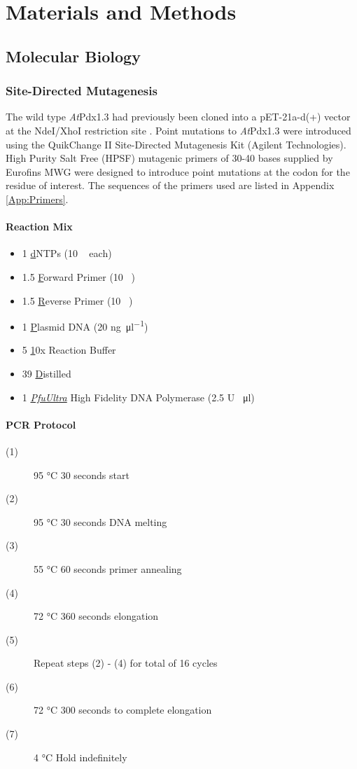  \chapter{Materials and Methods}\label{ch:Methods}
	\section{Molecular Biology}
		\subsection*{Site-Directed Mutagenesis}
		
The wild type \textit{At}Pdx1.3 had previously been cloned into a pET-21a-d(+) vector at the NdeI/XhoI restriction site \cite{Tambasco2005}. Point mutations to \textit{At}Pdx1.3 were introduced using the QuikChange II Site-Directed Mutagenesis Kit (Agilent Technologies). High Purity Salt Free (HPSF) mutagenic primers of 30-40 bases supplied by Eurofins MWG were designed to introduce point mutations at the codon for the residue of interest. The sequences of the primers used are listed in Appendix \ref{App:Primers}.
  
			\subsubsection{Reaction Mix}
				\begin{itemize}
				\item 1 \ul dNTPs (10 \si{\milli\molar} each)
				\item 1.5 \ul Forward Primer (10 \si{\micro\molar})
				\item 1.5 \ul Reverse Primer (10 \si{\micro\molar})
				\item 1 \ul Plasmid DNA (20 \si{\nano\gram\per\micro\litre})
				\item 5 \ul 10x Reaction Buffer
				\item 39 \ul Distilled  
				\item 1 \ul \textit{PfuUltra} High Fidelity DNA Polymerase (2.5 U \si{\per\micro\litre})	 
				\end{itemize}
\newpage				
			\subsubsection{PCR Protocol}
			\begin{description}
			\item[(1)] 95 \si{\degreeCelsius} 30 seconds start
			\item[(2)] 95 \si{\degreeCelsius} 30 seconds DNA melting	
			\item[(3)] 55 \si{\degreeCelsius} 60 seconds primer annealing
			\item[(4)] 72 \si{\degreeCelsius} 360 seconds elongation
			\item[(5)] Repeat steps (2) - (4) for total of 16 cycles
			\item[(6)] 72 \si{\degreeCelsius} 300 seconds to complete elongation
			\item[(7)] 4 \si{\degreeCelsius} Hold indefinitely
			\end{description}
			
